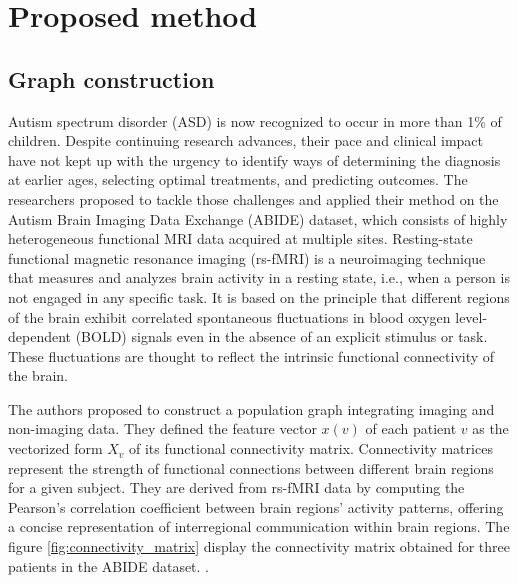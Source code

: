 

\section{Proposed method}

\subsection{Graph construction} 


Autism spectrum disorder (ASD) is now recognized to occur in more than 1\% of children. Despite continuing research advances, their pace and clinical impact have not kept up with the urgency to identify ways of determining the diagnosis at earlier ages, selecting optimal treatments, and predicting outcomes. The researchers \cite{Parisot17} proposed to tackle those challenges and applied their method on the Autism Brain Imaging Data Exchange (ABIDE) dataset, which consists of highly heterogeneous functional MRI data acquired at multiple sites. Resting-state functional magnetic resonance imaging (rs-fMRI) is a neuroimaging technique that measures and analyzes brain activity in a resting state, i.e., when a person is not engaged in any specific task. 
It is based on the principle that different regions of the brain exhibit correlated spontaneous fluctuations in blood oxygen level-dependent (BOLD) signals even in the absence of an explicit stimulus or task. These fluctuations are thought to reflect the intrinsic functional connectivity of the brain. 

The authors \cite{Parisot17} proposed to construct a population graph integrating imaging and non-imaging data. 
They defined the feature vector $x(v)$ of each patient $v$ as the vectorized form $X_{v}$ of its functional connectivity matrix. Connectivity matrices represent the strength of functional connections between different brain regions for a given subject. They are derived from rs-fMRI data by computing the Pearson's correlation coefficient between brain regions' activity patterns, offering a concise representation of interregional communication within brain regions. The figure \ref{fig:connectivity_matrix} display the connectivity matrix obtained for three patients in the ABIDE dataset. .  

